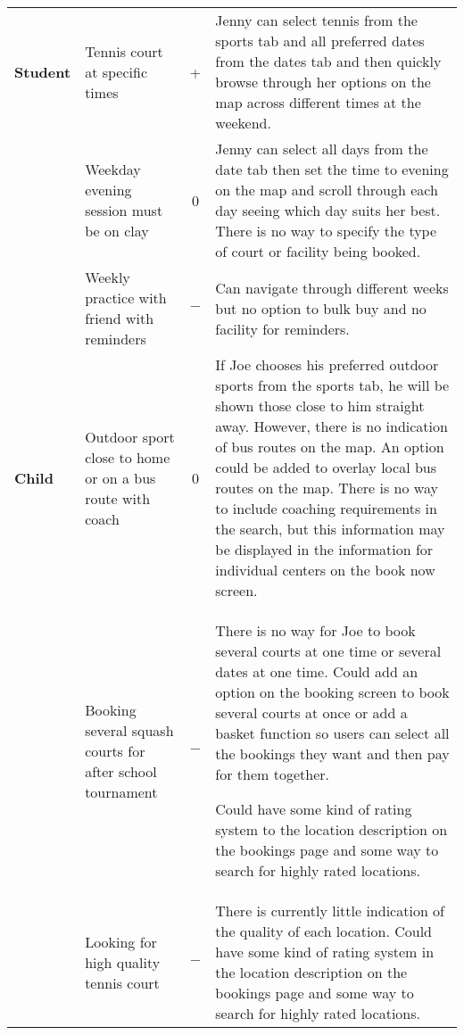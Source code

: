 \begin{center}
\begin{longtable}{p{} p{} c p{}}
		\midrule
		\textbf{Student} & Tennis court at specific times & + & Jenny can
		select tennis from the sports tab and all preferred dates from the
		dates tab and then quickly browse through her options on the map across
		different times at the weekend.\\

		& Weekday evening session must be on clay & 0 & Jenny can select all
		days from the date tab then set the time to evening on the map and
		scroll through each day seeing which day suits her best. There is no
		way to specify the type of court or facility being booked.\\

		& Weekly practice with friend with reminders & $-$ & Can navigate
		through different weeks but no option to bulk buy and no facility for
		reminders.\\

		\midrule
		\textbf{Child} & Outdoor sport close to home or on a bus route with
		coach & 0 & If Joe chooses his preferred outdoor sports from the sports
		tab, he will be shown those close to him straight away. However, there
		is no indication of bus routes on the map. An option could be added to
		overlay local bus routes on the map. There is no way to include
		coaching requirements in the search, but this information may be
		displayed in the information for individual centers on the book now
		screen.\\

		& Booking several squash courts for after school tournament & $-$ &
		There is no way for Joe to book several courts at one time or several
		dates at one time. Could add an option on the booking screen to book
		several courts at once or add a basket function so users can select all
		the bookings they want and then pay for them together.

		Could have some kind of rating system to the location description on
		the bookings page and some way to search for highly rated locations.\\

		& Looking for high quality tennis court & $-$ & There is currently
		little indication of the quality of each location. Could have some
		kind of rating system in the location description on the bookings page
		and some way to search for highly rated locations.\\
		\bottomrule
	\end{longtable}
\end{center}
\restoregeometry%

